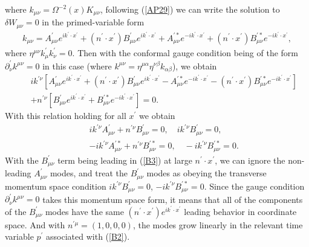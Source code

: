 %
where $k_{\mu\nu}=\Omega^{-2}(x)K_{\mu\nu}$, following
(\ref{AP29}) we can write the solution to $\delta W_{\mu\nu}=0$ in the primed-variable form
%
\begin{eqnarray}
k_{\mu\nu}=A^{\prime}_{\mu\nu}e^{ik^{\prime}\cdot x^{\prime}}+(n^{\prime}\cdot x^{\prime})B^{\prime}_{\mu\nu}e^{ik^{\prime}\cdot x^{\prime}}+A^{\prime *}_{\mu\nu}e^{-ik^{\prime}\cdot x^{\prime}}+(n^{\prime}\cdot x^{\prime})B^{\prime *}_{\mu\nu}e^{-ik^{\prime}\cdot x^{\prime}},
\label{B3}
\end{eqnarray}
%
where $\eta^{\mu\nu}k^{\prime}_{\mu}k^{\prime}_{\nu}=0$. Then with the conformal gauge condition being of the form $\partial^{\prime}_{\nu}k^{\mu\nu}=0$ in this case (where $k^{\mu\nu}=\eta^{\mu\alpha}\eta^{\nu\beta}k_{\alpha\beta}$), we obtain 
%
\begin{eqnarray}
&&ik^{\prime \nu}\left[A^{\prime}_{\mu\nu}e^{ik^{\prime}\cdot x^{\prime}}+(n^{\prime}\cdot x^{\prime})B^{\prime}_{\mu\nu}e^{ik^{\prime}\cdot x^{\prime}}-A^{\prime *}_{\mu\nu}e^{-ik^{\prime}\cdot x^{\prime}}-(n^{\prime}\cdot x^{\prime})B^{\prime *}_{\mu\nu}e^{-ik^{\prime}\cdot x^{\prime}}\right]
\nonumber\\
&&+n^{\prime\nu}\left[B^{\prime}_{\mu\nu}e^{ik^{\prime}\cdot x^{\prime}}+B^{\prime *}_{\mu\nu}e^{-ik^{\prime}\cdot x^{\prime}}\right]=0.
\label{B4}
\end{eqnarray}
%
With this relation holding for all $x^{\prime}$ we obtain
%
\begin{eqnarray}
&&ik^{\prime \nu}A^{\prime}_{\mu\nu}+n^{ \prime\nu}B^{\prime}_{\mu\nu}=0,\quad ik^{\prime \nu}B^{\prime}_{\mu\nu}=0, 
\nonumber\\
&&
-ik^{\prime \nu}A^{\prime *}_{\mu\nu}+n^{ \prime\nu}B^{\prime *}_{\mu\nu}=0,\quad -ik^{\prime \nu}B^{\prime *}_{\mu\nu}=0.
\label{B5}
\end{eqnarray}
%
With the $B^{\prime}_{\mu\nu}$ term being leading in (\ref{B3}) at large $n^{\prime}\cdot x^{\prime}$, we can ignore the non-leading $A^{\prime}_{\mu\nu}$ modes, and treat the $B^{\prime}_{\mu\nu}$ modes as obeying the transverse momentum space condition  $ik^{\prime \nu}B^{\prime}_{\mu\nu}=0$, $-ik^{\prime \nu}B^{\prime *}_{\mu\nu}=0$. Since the gauge condition $\partial^{\prime}_{\nu}k^{\mu\nu}=0$ takes this momentum space form, it means that all of the components of the $B^{\prime}_{\mu\nu}$ modes have the same $(n^{\prime}\cdot x^{\prime})e^{ik^{\prime}\cdot x^{\prime}}$ leading behavior in coordinate space. And with $n^{\prime \mu}=(1,0,0,0)$, the modes grow linearly in the relevant time variable $p^{\prime}$ associated with (\ref{B2}).


